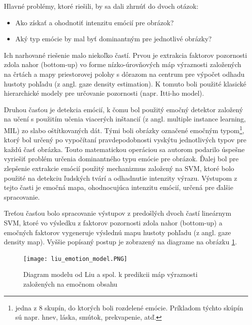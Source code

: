 Hlavné problémy, ktoré riešili, by sa dali zhrnúť do dvoch otázok:
\begin{itemize}
	\item Ako získať a ohodnotiť intenzitu emócií pre obrázok?
	\item Aký typ emócie by mal byť dominantným pre jednotlivé obrázky?
\end{itemize}

Ich narhované riešenie malo niekoľko častí. Prvou je extrakcia faktorov pozornosti zdola nahor (bottom-up) vo forme nízko-úrovňových máp výraznosti založených na črtách a mapy priestorovej polohy s dôrazom na centrum pre výpočet odhadu hustoty pohľadu (z angl. gaze density estimation). K tomuto boli použité klasické hierarchické modely pre určovanie pozornosti (napr. Itti-ho model).

Druhou časťou je detekcia emócií, k čomu bol použitý emočný detektor založený na učení s použitím učenia viacerých inštancií (z angl. multiple instance learning, MIL) zo slabo oštítkovaných dát. Tými boli obrázky označené emočným typom\footnote{jedna z 8 skupín, do ktorých boli rozdelené emócie. Príkladom týchto skúpín sú napr. hnev, láska, smútok, prekvapenie, atď.}, ktorý bol určený po vypočítaní pravdepodobnosti vyskýtu jednotlivých typov pre každú časť obrázka. Touto matematickou operáciou sa autorom podarilo úspešne vyriešiť problém určenia dominantného typu emócie pre obrázok.  Ďalej bol pre zlepšenie extrakcie emócií použitý mechanizmus založený na SVM, ktoré bolo použité na detekciu ľudských tvárí a odhadnutie intenzity výrazu. Výstupom z tejto časti je emočná mapa, ohodnocujúca intenzitu emócií, určená pre ďalšie spracovanie.

Treťou časťou bolo spracovanie výstupov z predošlých dvoch častí lineárnym SVM, ktoré vo výsledku z faktorov pozornosti zdola nahor (bottom-up) a emočných faktorov vygeneruje výslednú mapu hustoty pohľadu (z angl. gaze density map). Vyššie popísaný postup je zobrazený na diagrame na obrázku \ref{liu_image}.

\begin{figure}[H]
	\begin{center}
		\texttt{[image: liu\_emotion\_model.PNG]}
		\caption[Diagram modelu k predikcii máp výraznosti založených na emočnom obsahu]{Diagram modelu od Liu a spol. k predikcii máp výraznosti založených na emočnom obsahu\cite{liu2016improving}\label{liu_image}}
	\end{center}
\end{figure}

